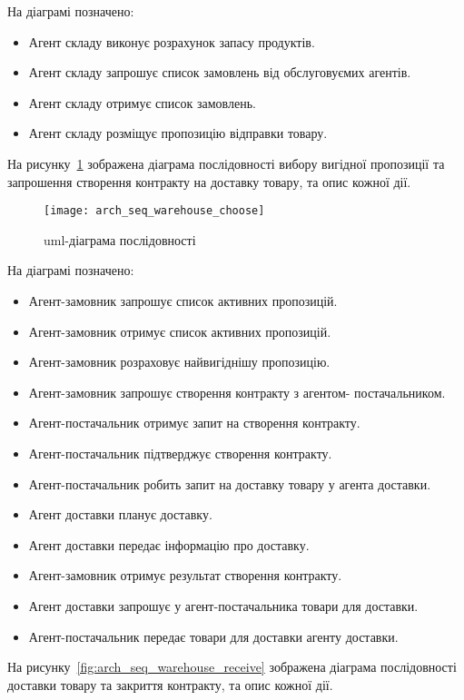 На діаграмі позначено:
\begin{itemize}
	\item Агент складу виконує розрахунок запасу продуктів.
	\item Агент складу запрошує список замовлень від обслуговуємих агентів.
	\item Агент складу отримує список замовлень.
	\item Агент складу розміщує пропозицію відправки товару.
\end{itemize}

На рисунку~\ref{fig:arch_seq_warehouse_choose} зображена діаграма послідовності вибору вигідної пропозиції та запрошення створення контракту на доставку товару, та опис кожної дії.

\begin{figure}[H]
	\centering
	\texttt{[image: arch\_seq\_warehouse\_choose]}
	\caption{\acrshort{uml}-діаграма послідовності}
	\label{fig:arch_seq_warehouse_choose}
\end{figure} 

На діаграмі позначено:
\begin{itemize}
	\item Агент-замовник запрошує список активних пропозицій.
	\item Агент-замовник отримує список активних пропозицій.
	\item Агент-замовник розраховує найвигіднішу пропозицію.
	\item Агент-замовник запрошує створення контракту з агентом-
	постачальником.
	\item Агент-постачальник отримує запит на створення контракту.
	\item Агент-постачальник підтверджує створення контракту.
	\item Агент-постачальник робить запит на доставку товару у агента
	доставки.
	\item Агент доставки планує доставку.
	\item Агент доставки передає інформацію про доставку.
	\item Агент-замовник отримує результат створення контракту.
	\item Агент доставки запрошує у агент-постачальника товари для
	доставки.
	\item Агент-постачальник передає товари для доставки агенту доставки.
\end{itemize}

На рисунку~\ref{fig:arch_seq_warehouse_receive} зображена діаграма послідовності доставки товару та закриття контракту, та опис кожної дії.

